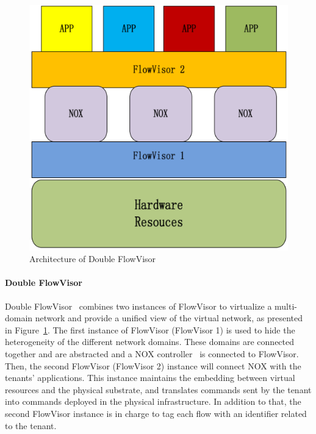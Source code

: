 \begin{figure}[h]
    \centering
    \includegraphics[scale=0.6]{figures/double_fv.png}
    \caption{Architecture of Double FlowVisor}
    \label{fig:double-fv}
\end{figure}

\paragraph{Double FlowVisor}
Double FlowVisor~\cite{DoubleFV-Yin2013} combines two instances of FlowVisor to virtualize a multi-domain network and provide a unified view of the virtual network, as presented in Figure~\ref{fig:double-fv}. The first instance of FlowVisor (FlowVisor 1) is used to hide the heterogeneity of the different network domains. These domains are connected together and are abstracted and a NOX controller~\cite{nox-gude2008} is connected to FlowVisor.
Then, the second FlowVisor  (FlowVisor 2) instance will connect NOX with the tenants' applications. This instance maintains the embedding between virtual resources and the physical substrate, and translates commands sent by the tenant into commands deployed in the physical infrastructure. In addition to that, the second FlowVisor instance is in charge to tag each flow with an identifier related to the tenant.

